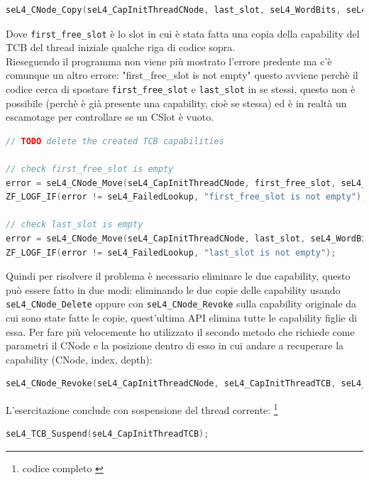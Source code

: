\begin{lstlisting}[language=C++]
seL4_CNode_Copy(seL4_CapInitThreadCNode, last_slot, seL4_WordBits, seL4_CapInitThreadCNode, first_free_slot, seL4_WordBits, seL4_AllRights);
\end{lstlisting}
Dove \texttt{first\_free\_slot} è lo slot in cui è stata fatta una copia della capability del TCB del thread iniziale qualche riga di codice sopra.\\
Rieseguendo il programma non viene più mostrato l'errore predente ma c'è comunque un altro errore: "first\_free\_slot is not empty" questo avviene perchè il codice cerca di spostare \texttt{first\_free\_slot} e \texttt{last\_slot} in se stessi, questo non è possibile (perchè è già presente una capability, cioè se stessa) ed è in realtà un escamotage per controllare se un CSlot è vuoto.
\begin{lstlisting}[language=C++]
// TODO delete the created TCB capabilities
           
// check first_free_slot is empty
error = seL4_CNode_Move(seL4_CapInitThreadCNode, first_free_slot, seL4_WordBits, seL4_CapInitThreadCNode, first_free_slot, seL4_WordBits);
ZF_LOGF_IF(error != seL4_FailedLookup, "first_free_slot is not empty");

// check last_slot is empty
error = seL4_CNode_Move(seL4_CapInitThreadCNode, last_slot, seL4_WordBits, seL4_CapInitThreadCNode, last_slot, seL4_WordBits);
ZF_LOGF_IF(error != seL4_FailedLookup, "last_slot is not empty");
\end{lstlisting}
Quindi per risolvere il problema è necessario eliminare le due capability, questo può essere fatto in due modi: eliminando le due copie delle capability usando \texttt{seL4\_CNode\_Delete} oppure con \texttt{seL4\_CNode\_Revoke} sulla capability originale da cui sono state fatte le copie, quest'ultima API elimina tutte le capability figlie di essa. Per fare più velocemente ho utilizzato il secondo metodo che richiede come parametri il CNode e la posizione dentro di esso in cui andare a recuperare la capability (CNode, index, depth):
\begin{lstlisting}[language=C++]
seL4_CNode_Revoke(seL4_CapInitThreadCNode, seL4_CapInitThreadTCB, seL4_WordBits);
\end{lstlisting}
L'esercitazione conclude con sospensione del thread corrente: \footnote{codice completo \cite{capability}}
\begin{lstlisting}[language=C++]
seL4_TCB_Suspend(seL4_CapInitThreadTCB);
\end{lstlisting}


